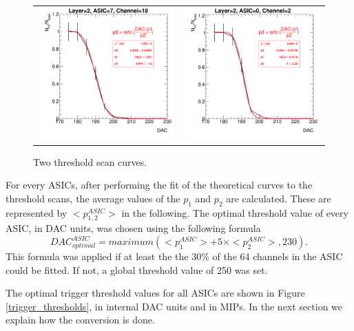 \documentclass[a4paper,11pt]{article}
\begin{document}
\begin{figure}[!ht]
  \centering
  \begin{tabular}{ll}
  \includegraphics[width=2.8in]{scurve_chn18_asic7_layer2-eps-converted-to.pdf} & \includegraphics[width=2.8in]{scurve_chn2_asic0_layer2-eps-converted-to.pdf}
  \end{tabular}
\caption{Two threshold scan curves.}
\label{scurve_channels}
\end{figure}


For every ASICs, after performing the fit of the theoretical curves
to the threshold scans, the average values of the   $p_{1}$ and $p_{2}$ are calculated.
These are represented by $<p_{1,2}^{ASIC}>$ in the following.
The optimal threshold value of every ASIC, in DAC units, was chosen 
using the following formula
\begin{equation}
DAC_{optimal}^{ASIC} =maximum(<p_{1}^{ASIC}> + 5 \times <p_{2}^{ASIC}>,230).
\end{equation}
This formula was applied 
if at least the the 30\% of the 64 channels in the ASIC could be fitted.
If not, a global threshold value of 250 was set.

The optimal trigger threshold values for all ASICs are shown in Figure \ref{trigger_thresholds}, in internal DAC units and in MIPs. In the next section we explain how the conversion is done.
\end{document}
